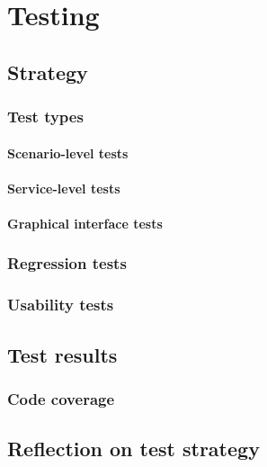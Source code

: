 \chapter{Testing}
\label{Testing}

\section{Strategy}
\label{Testing_Strategy}

\subsection{Test types}
\label{Testing_Strategy_Types}

\subsubsection{Scenario-level tests}
\label{Testing_Strategy_Types_Scenario}

\subsubsection{Service-level tests}
\label{Testing_Strategy_Types_Service}

\subsubsection{Graphical interface tests}
\label{Testing_Strategy_Types_EndUser}

\subsection{Regression tests}
\label{Testing_Strategy_Regression}

\subsection{Usability tests}
\label{Testing_Strategy_Usability}

\section{Test results}
\label{Testing_Results}

\subsection{Code coverage}
\label{Testing_Results_Coverage}

\section{Reflection on test strategy}
\label{Testing_Reflection}
